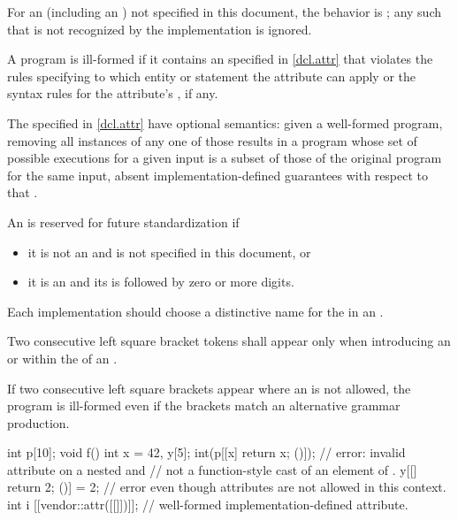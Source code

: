 \pnum
For an 
(including an )
not specified in this document, the
behavior is ;
any such  that is not recognized by the implementation
is ignored.
\begin{note}
A program is ill-formed if it contains an 
specified in \ref{dcl.attr} that violates
the rules specifying to which entity or statement the attribute can apply or
the syntax rules for the attribute's , if any.
\end{note}
\begin{note}
The  specified in \ref{dcl.attr}
have optional semantics:
given a well-formed program,
removing all instances of any one of those 
results in a program whose set of possible executions
for a given input is
a subset of those of the original program for the same input,
absent implementation-defined guarantees
with respect to that .
\end{note}
An  is reserved for future standardization if
\begin{itemize}
\item it is not an  and
is not specified in this document, or
\item it is an  and
its  is
 followed by zero or more digits.
\end{itemize}
Each implementation should choose a distinctive name for the
 in an .

\pnum
Two consecutive left square bracket tokens shall appear only
when introducing an  or
within the  of
an .
\begin{note}
If two consecutive left square brackets appear
where an  is not allowed, the program is ill-formed even
if the brackets match an alternative grammar production.
\end{note}
\begin{example}
\begin{codeblock}
int p[10];
void f() {
  int x = 42, y[5];
  int(p[[x] { return x; }()]);  // error: invalid attribute on a nested  and
                                // not a function-style cast of an element of .
  y[[] { return 2; }()] = 2;    // error even though attributes are not allowed in this context.
  int i [[vendor::attr([[]])]]; // well-formed implementation-defined attribute.
}
\end{codeblock}
\end{example}


